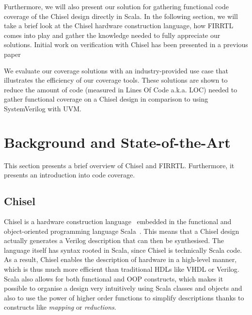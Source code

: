 \documentclass[runningheads]{llncs}
\begin{document}
Furthermore, we will also present our solution for gathering functional code coverage of the Chisel design directly in Scala. In the following section, we will take a brief look at the Chisel hardware construction language, how FIRRTL comes into play and gather the knowledge needed to fully appreciate our solutions. Initial work on verification with Chisel has been presented in a previous paper~\cite{blind} %

We evaluate our coverage solutions with an industry-provided use case that illustrates the efficiency of our coverage tools. These solutions are shown to reduce the amount of code (measured in Lines Of Code a.k.a. LOC) needed to gather functional coverage on a Chisel design in comparison to using SystemVerilog with UVM.

\section{Background and State-of-the-Art}
\label{sec:background}
This section presents a brief overview of Chisel and FIRRTL. Furthermore, it presents an introduction into code coverage.

\subsection{Chisel}
Chisel is a hardware construction language~\cite{chisel:dac2012, chisel:book} embedded in the functional and object-oriented programming language Scala~\cite{Scala}. This means that a Chisel design actually generates a Verilog description that can then be synthesised. The language itself has syntax rooted in Scala, since Chisel is technically Scala code. As a result, Chisel enables the description of hardware in a high-level manner, which is thus much more efficient than traditional HDLs like VHDL or Verilog. Scala also allows for both functional and OOP constructs, which makes it possible to organise a design very intuitively using Scala classes and objects and also to use the power of higher order functions to simplify descriptions thanks to constructs like \textit{mapping} or \textit{reductions}.
\end{document}
